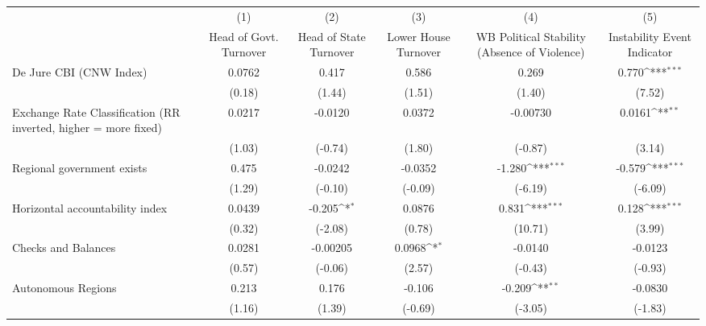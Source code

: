 {
\def\sym#1{\ifmmode^{#1}\else\(^{#1}\)\fi}
\begin{tabular*}{\linewidth}{@{\hskip\tabcolsep\extracolsep\fill}l*{5}{c}}
\hline\hline
                &\multicolumn{1}{c}{(1)}&\multicolumn{1}{c}{(2)}&\multicolumn{1}{c}{(3)}&\multicolumn{1}{c}{(4)}&\multicolumn{1}{c}{(5)}\\
                &\multicolumn{1}{c}{Head of Govt. Turnover}&\multicolumn{1}{c}{Head of State Turnover}&\multicolumn{1}{c}{Lower House Turnover}&\multicolumn{1}{c}{WB Political Stability (Absence of Violence)}&\multicolumn{1}{c}{Instability Event Indicator}\\
\hline
De Jure CBI (CNW Index)&   0.0762         &    0.417         &    0.586         &    0.269         &    0.770\sym{***}\\
                &   (0.18)         &   (1.44)         &   (1.51)         &   (1.40)         &   (7.52)         \\
[1em]
Exchange Rate Classification (RR inverted, higher = more fixed)&   0.0217         &  -0.0120         &   0.0372         & -0.00730         &   0.0161\sym{**} \\
                &   (1.03)         &  (-0.74)         &   (1.80)         &  (-0.87)         &   (3.14)         \\
[1em]
Regional government exists   &    0.475         &  -0.0242         &  -0.0352         &   -1.280\sym{***}&   -0.579\sym{***}\\
                &   (1.29)         &  (-0.10)         &  (-0.09)         &  (-6.19)         &  (-6.09)         \\
[1em]
Horizontal accountability index&   0.0439         &   -0.205\sym{*}  &   0.0876         &    0.831\sym{***}&    0.128\sym{***}\\
                &   (0.32)         &  (-2.08)         &   (0.78)         &  (10.71)         &   (3.99)         \\
[1em]
Checks and Balances&   0.0281         & -0.00205         &   0.0968\sym{*}  &  -0.0140         &  -0.0123         \\
                &   (0.57)         &  (-0.06)         &   (2.57)         &  (-0.43)         &  (-0.93)         \\
[1em]
Autonomous Regions&    0.213         &    0.176         &   -0.106         &   -0.209\sym{**} &  -0.0830         \\
                &   (1.16)         &   (1.39)         &  (-0.69)         &  (-3.05)         &  (-1.83)         \\

\end{tabular*}}
